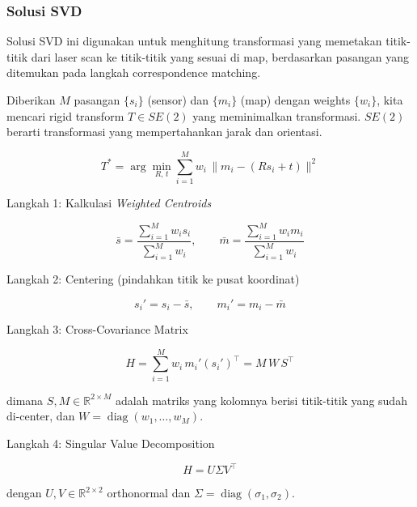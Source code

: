 \subsubsection{Solusi SVD}

Solusi SVD ini digunakan untuk menghitung transformasi yang memetakan titik-titik dari laser scan ke titik-titik yang sesuai di map, berdasarkan pasangan yang ditemukan pada langkah correspondence matching.

Diberikan $M$ pasangan $\{s_i\}$ (sensor) dan $\{m_i\}$ (map) dengan weights $\{w_i\}$, kita mencari rigid transform $T \in SE(2)$ yang meminimalkan transformasi. $SE(2)$ berarti transformasi yang mempertahankan jarak dan orientasi.


\begin{equation}T^* = \arg\min_{R,\,t} \sum_{i=1}^{M} w_i \, \big\| m_i - (R s_i + t) \big\|^2\end{equation}

Langkah 1: Kalkulasi \emph{Weighted Centroids}

\begin{equation}\bar{s} = \frac{\sum_{i=1}^{M} w_i s_i}{\sum_{i=1}^{M} w_i}, \qquad \bar{m} = \frac{\sum_{i=1}^{M} w_i m_i}{\sum_{i=1}^{M} w_i}\end{equation}

Langkah 2: Centering (pindahkan titik ke pusat koordinat)

\begin{equation}s_i' = s_i - \bar{s}, \qquad m_i' = m_i - \bar{m}\end{equation}

Langkah 3: Cross-Covariance Matrix

\begin{equation}H = \sum_{i=1}^{M} w_i \, m_i' (s_i')^\top = M \, W \, S^\top\end{equation}

dimana $S, M \in \mathbb{R}^{2 \times M}$ adalah matriks yang kolomnya berisi titik-titik yang sudah di-center, dan $W = \operatorname{diag}(w_1, \dots, w_M)$.

Langkah 4: Singular Value Decomposition

\begin{equation}H = U \Sigma V^\top\end{equation}

dengan $U, V \in \mathbb{R}^{2 \times 2}$ orthonormal dan $\Sigma = \operatorname{diag}(\sigma_1, \sigma_2)$.

